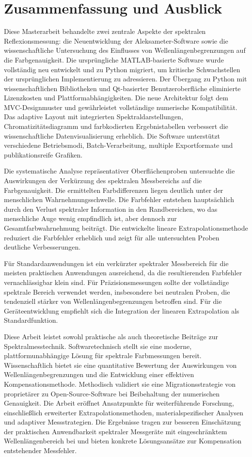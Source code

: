 \chapter{Zusammenfassung und Ausblick}

Diese Masterarbeit behandelte zwei zentrale Aspekte der spektralen Reflexionsmessung: die Neuentwicklung der Aleksameter-Software sowie die wissenschaftliche Untersuchung des Einflusses von Wellenlängenbegrenzungen auf die Farbgenauigkeit. Die ursprüngliche MATLAB-basierte Software wurde vollständig neu entwickelt und zu Python migriert, um kritische Schwachstellen der ursprünglichen Implementierung zu adressieren. Der Übergang zu Python mit wissenschaftlichen Bibliotheken und Qt-basierter Benutzeroberfläche eliminierte Lizenzkosten und Plattformabhängigkeiten. Die neue Architektur folgt dem MVC-Designmuster und gewährleistet vollständige numerische Kompatibilität. Das adaptive Layout mit integrierten Spektraldarstellungen, Chromatizitätsdiagramm und farbkodierten Ergebnistabellen verbessert die wissenschaftliche Datenvisualisierung erheblich. Die Software unterstützt verschiedene Betriebsmodi, Batch-Verarbeitung, multiple Exportformate und publikationsreife Grafiken.

Die systematische Analyse repräsentativer Oberflächenproben untersuchte die Auswirkungen der Verkürzung des spektralen Messbereichs auf die Farbgenauigkeit. Die ermittelten Farbdifferenzen liegen deutlich unter der menschlichen Wahrnehmungsschwelle. Die Farbfehler entstehen hauptsächlich durch den Verlust spektraler Information in den Randbereichen, wo das menschliche Auge wenig empfindlich ist, aber dennoch zur Gesamtfarbwahrnehmung beiträgt. Die entwickelte lineare Extrapolationsmethode reduziert die Farbfehler erheblich und zeigt für alle untersuchten Proben deutliche Verbesserungen.

Für Standardanwendungen ist ein verkürzter spektraler Messbereich für die meisten praktischen Anwendungen ausreichend, da die resultierenden Farbfehler vernachlässigbar klein sind. Für Präzisionsmessungen sollte der vollständige spektrale Bereich verwendet werden, insbesondere bei neutralen Proben, die tendenziell stärker von Wellenlängenbegrenzungen betroffen sind. Für die Geräteentwicklung empfiehlt sich die Integration der linearen Extrapolation als Standardfunktion.

Diese Arbeit leistet sowohl praktische als auch theoretische Beiträge zur Spektralmesstechnik. Softwaretechnisch stellt sie eine moderne, plattformunabhängige Lösung für spektrale Farbmessungen bereit. Wissenschaftlich bietet sie eine quantitative Bewertung der Auswirkungen von Wellenlängenbegrenzungen und die Entwicklung einer effektiven Kompensationsmethode. Methodisch validiert sie eine Migrationsstrategie von proprietärer zu Open-Source-Software bei Beibehaltung der numerischen Genauigkeit. Die Arbeit eröffnet Ansatzpunkte für weiterführende Forschung, einschließlich erweiterter Extrapolationsmethoden, materialspezifischer Analysen und adaptiver Messstrategien. Die Ergebnisse tragen zur besseren Einschätzung der praktischen Anwendbarkeit spektraler Messgeräte mit eingeschränktem Wellenlängenbereich bei und bieten konkrete Lösungsansätze zur Kompensation entstehender Messfehler. 